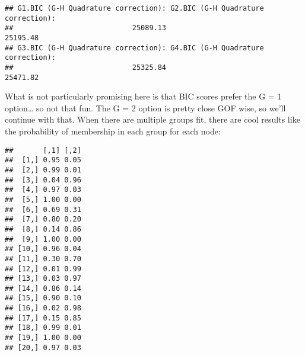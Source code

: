 \documentclass[
]{article}
\newenvironment{Shaded}{\begin{snugshade}}{\end{snugshade}}
\newcommand{\ControlFlowTok}[1]{\textcolor[rgb]{0.13,0.29,0.53}{\textbf{#1}}}
\newcommand{\DataTypeTok}[1]{\textcolor[rgb]{0.13,0.29,0.53}{#1}}
\newcommand{\DecValTok}[1]{\textcolor[rgb]{0.00,0.00,0.81}{#1}}
\newcommand{\KeywordTok}[1]{\textcolor[rgb]{0.13,0.29,0.53}{\textbf{#1}}}
\newcommand{\NormalTok}[1]{#1}
\newcommand{\OperatorTok}[1]{\textcolor[rgb]{0.81,0.36,0.00}{\textbf{#1}}}
\newcommand{\StringTok}[1]{\textcolor[rgb]{0.31,0.60,0.02}{#1}}
\begin{document}
\begin{Shaded}
\end{Shaded}

\begin{verbatim}
## G1.BIC (G-H Quadrature correction): G2.BIC (G-H Quadrature correction): 
##                            25089.13                            25195.48 
## G3.BIC (G-H Quadrature correction): G4.BIC (G-H Quadrature correction): 
##                            25325.84                            25471.82
\end{verbatim}

What is not particularly promising here is that BIC scores prefer the G
= 1 option\ldots{} so not that fun. The G = 2 option is pretty close GOF
wise, so we'll continue with that. When there are multiple groups fit,
there are cool results like the probability of membership in each group
for each node:

\begin{Shaded}
\end{Shaded}

\begin{verbatim}
##       [,1] [,2]
##  [1,] 0.95 0.05
##  [2,] 0.99 0.01
##  [3,] 0.04 0.96
##  [4,] 0.97 0.03
##  [5,] 1.00 0.00
##  [6,] 0.69 0.31
##  [7,] 0.80 0.20
##  [8,] 0.14 0.86
##  [9,] 1.00 0.00
## [10,] 0.96 0.04
## [11,] 0.30 0.70
## [12,] 0.01 0.99
## [13,] 0.03 0.97
## [14,] 0.86 0.14
## [15,] 0.90 0.10
## [16,] 0.02 0.98
## [17,] 0.15 0.85
## [18,] 0.99 0.01
## [19,] 1.00 0.00
## [20,] 0.97 0.03
\end{verbatim}
\end{document}
